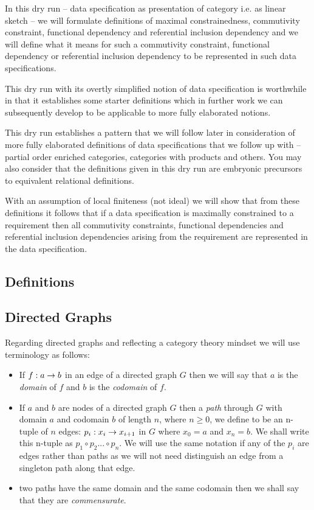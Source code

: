 \documentclass[10pt,a4paper]{article}
\theoremstyle{remark}
\renewcommand{\term}[1]{\textit{#1}}  %
\begin{document}
\note
In this dry run -- data specification as presentation of category i.e. as linear sketch \cite{BarrandWells}-- we will formulate 
definitions of maximal constrainedness, commutivity constraint, functional dependency and referential inclusion dependency
and we will define what it means for such a commutivity constraint, functional dependency or  referential inclusion dependency to be represented in such data specifications.

\note
This dry run with its overtly simplified notion of data specification is worthwhile in that   it establishes some starter definitions which in further work we can subsequently develop to be applicable to more fully elaborated notions.

\note 
This dry run establishes a pattern that we will follow later in consideration of more fully elaborated 
definitions of 
data specifications that we follow up with -- partial order enriched categories, categories with products and others. 
You may also consider that the definitions given in this dry run are embryonic precursors to equivalent relational definitions.

\note
With an assumption of local finiteness (not ideal) we will show that from these definitions it follows that if a data specification is maximally constrained to a
requirement then  all commutivity constraints,  functional dependencies and referential inclusion dependencies arising from the requirement are represented in the data specification.

\subsection {Definitions}

\subsection{Directed Graphs}
Regarding directed graphs and reflecting a category theory mindset we will use terminology as follows:
\begin{itemize}
\item
 If $f: a \rightarrow b$ in an edge of a directed graph $G$ then we will say that $a$ is the \term{domain} of $f$ and $b$ is the \term{codomain} of $f$.
\item
If $a$ and $b$ are nodes of a directed graph $G$ then a \term{path} through $G$ with domain $a$ and 
codomain $b$ of length $n$, where $n \geq 0$, we define to be  an n-tuple of  $n$ edges: $p_i: x_i \rightarrow x_{i+1} $ in $G$ where $x_0=a$ and $x_n=b$. We shall write this n-tuple as $p_1 \circ p_2... \circ p_n$. 
We will use the same notation if any of the $p_i$ are edges rather than paths as we will not need distinguish  an edge from a singleton path along that edge. 
\item two paths have the same domain and the same codomain then we shall say that they are \term{commensurate}.
\end{itemize}
\end{document}
